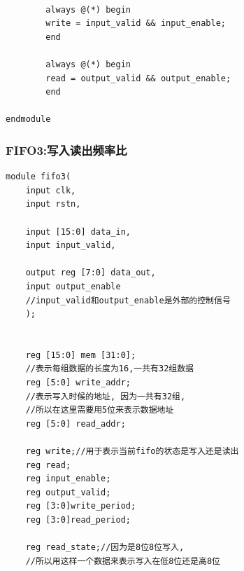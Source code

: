 \documentclass[fontset=windows,12pt]{article}
\begin{document}
{\begin{lstlisting}
                
        always @(*) begin
        write = input_valid && input_enable;
        end
        
        always @(*) begin
        read = output_valid && output_enable;
        end
    
endmodule
    \end{lstlisting}}
    \subsubsection{FIFO3:写入读出频率比}
    {\setmainfont{Courier New Bold}                               
    \begin{lstlisting}
module fifo3(
    input clk,
    input rstn,
    
    input [15:0] data_in,
    input input_valid,
    
    output reg [7:0] data_out,
    input output_enable 
    //input_valid和output_enable是外部的控制信号
    );
    
    
    reg [15:0] mem [31:0];
    //表示每组数据的长度为16,一共有32组数据
    reg [5:0] write_addr;
    //表示写入时候的地址, 因为一共有32组,
    //所以在这里需要用5位来表示数据地址
    reg [5:0] read_addr;
    
    reg write;//用于表示当前fifo的状态是写入还是读出
    reg read;
    reg input_enable;
    reg output_valid;
    reg [3:0]write_period;
    reg [3:0]read_period;
    
    reg read_state;//因为是8位8位写入, 
    //所以用这样一个数据来表示写入在低8位还是高8位
    

\end{lstlisting}}
\end{document}
